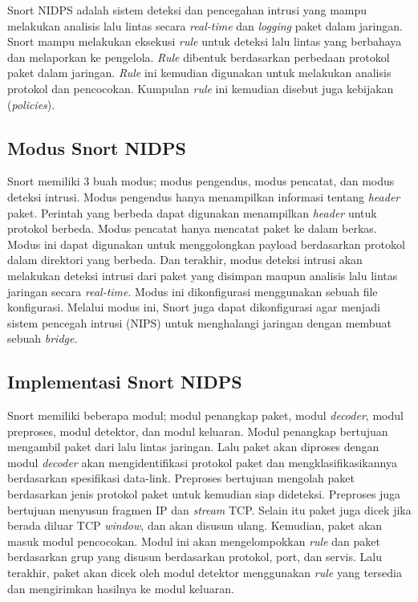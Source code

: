    Snort NIDPS adalah sistem deteksi dan pencegahan intrusi yang mampu melakukan analisis lalu lintas secara \emph{real-time} dan \emph{logging} paket dalam jaringan. Snort mampu melakukan eksekusi \emph{rule} untuk deteksi lalu lintas yang berbahaya dan melaporkan ke pengelola. \emph{Rule} dibentuk berdasarkan perbedaan protokol paket dalam jaringan. \emph{Rule} ini kemudian digunakan untuk melakukan analisis protokol dan pencocokan. Kumpulan \emph{rule} ini kemudian disebut juga kebijakan (\emph{policies}). 

  \subsection{Modus Snort NIDPS}

    Snort memiliki 3 buah modus; modus pengendus, modus pencatat, dan modus deteksi intrusi. Modus pengendus hanya menampilkan informasi tentang \emph{header} paket. Perintah yang berbeda dapat digunakan menampilkan \emph{header} untuk protokol berbeda. Modus pencatat hanya mencatat paket ke dalam berkas. Modus ini dapat digunakan untuk menggolongkan payload berdasarkan protokol dalam direktori yang berbeda. Dan terakhir, modus deteksi intrusi akan melakukan deteksi intrusi dari paket yang disimpan maupun analisis lalu lintas jaringan secara \emph{real-time}. Modus ini dikonfigurasi menggunakan sebuah file konfigurasi. Melalui modus ini, Snort juga dapat dikonfigurasi agar menjadi sistem pencegah intrusi (NIPS) untuk menghalangi jaringan dengan membuat sebuah \emph{bridge}.

  \subsection{Implementasi Snort NIDPS}

    Snort memiliki beberapa modul; modul penangkap paket, modul \emph{decoder}, modul preproses, modul detektor, dan modul keluaran. Modul penangkap bertujuan mengambil paket dari lalu lintas jaringan. Lalu paket akan diproses dengan modul \emph{decoder} akan mengidentifikasi protokol paket dan mengklasifikasikannya berdasarkan spesifikasi data-link. Preproses bertujuan mengolah paket berdasarkan jenis protokol paket untuk kemudian siap dideteksi. Preproses juga bertujuan menyusun fragmen IP dan \emph{stream} TCP. Selain itu paket juga dicek jika berada diluar TCP \emph{window}, dan akan disusun ulang. Kemudian, paket akan masuk modul pencocokan. Modul ini akan mengelompokkan \emph{rule} dan paket berdasarkan grup yang disusun berdasarkan protokol, port, dan servis. Lalu terakhir, paket akan dicek oleh modul detektor menggunakan \emph{rule} yang tersedia dan mengirimkan hasilnya ke modul keluaran.

